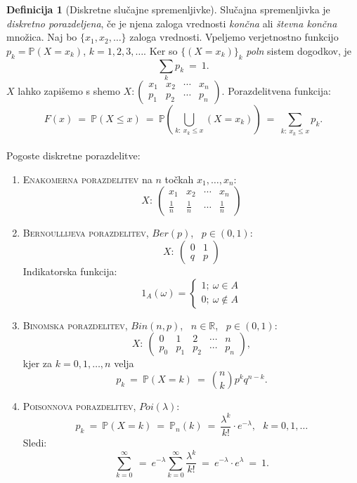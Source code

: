 \documentclass[11pt]{article}
\theoremstyle{definition}
\newtheorem{definicija}{Definicija}[section]
\theoremstyle{definition}
\theoremstyle{definition}
\begin{document}
\begin{definicija}[Diskretne slučajne spremenljivke]

Slučajna spremenljivka je \textit{diskretno porazdeljena}, če je njena zaloga vrednosti \textit{končna} ali \textit{števna končna} množica. Naj bo $\{ x_1, x_2, \ldots \}$ zaloga vrednosti. Vpeljemo verjetnostno funkcijo $p_k = \mathbb{P}(X = x_k)$, $k = 1, 2, 3, \ldots.$ Ker so $\{ (X = x_k) \}_k$ \textit{poln} sistem dogodkov, je 
$$\sum_k p_k ~=~ 1.$$
$X$ lahko zapišemo s shemo 
$X: \begin{pmatrix}
	x_1 & x_2 & \cdots & x_n \\
	p_1 & p_2 & \cdots & p_n
\end{pmatrix}$. Porazdelitvena funkcija:
$$F(x) ~=~ \mathbb{P}(X \leq x) ~=~ \mathbb{P}\left( \bigcup_{k:~ x_k \leq x} (X = x_k) \right) ~=~ \sum_{k:~ x_k \leq x} p_k.$$ \\

\noindent Pogoste diskretne porazdelitve:
\begin{enumerate}
	\item \textsc{Enakomerna porazdelitev} na $n$ točkah $x_1, \ldots, x_n$:
	$$X: ~\begin{pmatrix}
		x_1 & x_2 & \cdots & x_n \\
		\frac{1}{n} & \frac{1}{n} & \cdots & \frac{1}{n}
	\end{pmatrix}$$
	
	\item \textsc{Bernoullijeva porazdelitev}, $Ber(p)$, ~$p \in (0, 1)$:
	$$X: ~\begin{pmatrix}
		0 & 1 \\
		q & p
	\end{pmatrix}$$
	Indikatorska funkcija:
	$$1_A(\omega) = \begin{cases}
	1 ; ~\omega \in A \\
	0 ; ~\omega \notin A
	\end{cases}$$
	
	\item \textsc{Binomska porazdelitev}, $Bin(n, p)$, ~$n \in \mathbb{R}$, ~$p \in (0, 1)$:
	$$X: ~\begin{pmatrix}
		0 & 1 & 2 & \cdots & n \\
		p_0 & p_1 & p_2 & \cdots & p_n
	\end{pmatrix},$$
	kjer za $k = 0, 1, \ldots, n$ velja
	$$p_k ~=~ \mathbb{P}(X = k) ~=~ \binom{n}{k} p^k q^{n-k}.$$
	
	\item \textsc{Poisonnova porazdelitev}, $Poi(\lambda)$:
	$$p_k ~=~ \mathbb{P}(X = k) ~=~ \mathbb{P}_n(k) ~=~ \frac{\lambda^k}{k!} \cdot e^{-\lambda}, ~~~k = 0, 1, \ldots$$
	Sledi:
	$$\sum_{k=0}^{\infty} ~=~ e^{-\lambda} \sum_{k=0}^{\infty} \frac{\lambda^k}{k!} ~=~ e^{-\lambda} \cdot e^{\lambda} ~=~ 1.$$
	

\end{enumerate}
\end{definicija}
\end{document}
